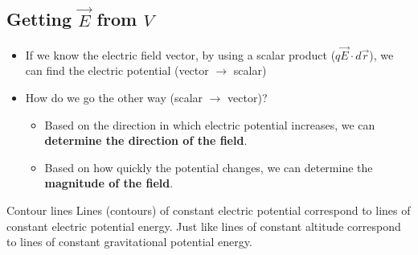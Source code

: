 \documentclass[aspectratio=169,
hyperref={colorlinks,urlcolor=blue}
]{beamer}
\begin{document}



\subsection{Getting $\vec E$ from $V$}
\label{subsec:gettingefromv}
{
\begin{itemize}
\item If we know the electric field vector, by using a scalar product ($q\vec E \cdot d\vec r$), we can find the electric potential (vector $\to$ scalar)
\item How do we go the other way (scalar $\to$ vector)?
\begin{itemize}
\item Based on the direction in which electric potential increases, we can \textbf{determine the direction of the field}.
\item Based on how quickly the potential changes, we can determine the \textbf{magnitude of the field}. 
\end{itemize}

\end{itemize}
}
{
\begin{block}{Contour lines}
Lines (contours) of constant electric potential correspond to lines of constant electric potential energy. Just like lines of constant altitude correspond to lines of constant gravitational potential energy.
\end{block}
}
\end{document}
